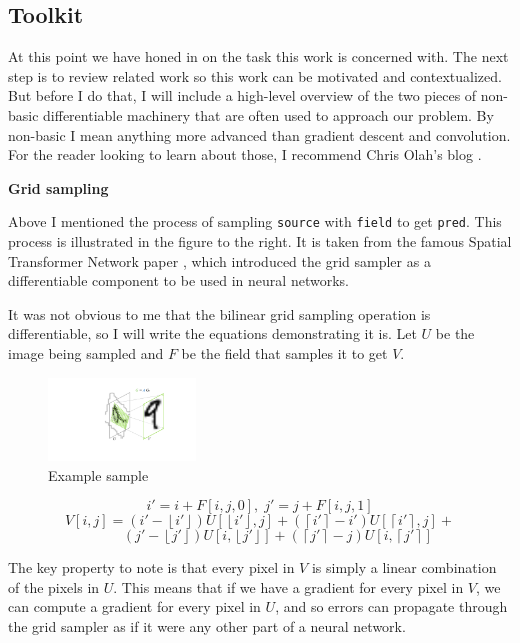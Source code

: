 \documentclass[12pt,a4paper]{article}
\begin{document}
\subsection{Toolkit}

At this point we have honed in on the task this work is concerned with. The next step is to review related work so this work can be motivated and contextualized. But before I do that, I will include a high-level overview of the two pieces of non-basic differentiable machinery that are often used to approach our problem. By non-basic I mean anything more advanced than gradient descent and convolution. For the reader looking to learn about those, I recommend Chris Olah's blog \cite{colah}.


{\bf Grid sampling}

Above I mentioned the process of sampling {\tt source} with {\tt field} to get {\tt pred}. This process is illustrated in the figure to the right. It is taken from the famous Spatial Transformer Network paper \cite{stn}, which introduced the grid sampler as a differentiable component to be used in neural networks.

It was not obvious to me that the bilinear grid sampling operation is differentiable, so I will write the equations demonstrating it is. Let $U$ be the image being sampled and $F$ be the field that samples it to get $V$.
\begin{figure}
\centering
\includegraphics[width=0.35\textwidth]{trans1.pdf}
\caption{\label{fig:sample}Example sample}
\end{figure}
$$ i' = i+F[i,j,0], \; j' = j+F[i,j,1]$$
$$ V[i,j] = 
(i'-\left\lfloor{i'}\right\rfloor)U[\left\lfloor{i'}\right\rfloor,j] + (\left\lceil{i'}\right\rceil-i')U[\left\lceil{i'}\right\rceil,j] + $$
$$ \qquad \; \; (j'-\left\lfloor{j'}\right\rfloor)U[i,\left\lfloor{j'}\right\rfloor] + (\left\lceil{j'}\right\rceil-j)U[i,\left\lceil{j'}\right\rceil]$$
$$ $$

The key property to note is that every pixel in $V$ is simply a linear combination of the pixels in $U$. This means that if we have a gradient for every pixel in $V$, we can compute a gradient for every pixel in $U$, and so errors can propagate through the grid sampler as if it were any other part of a neural network.
\end{document}
